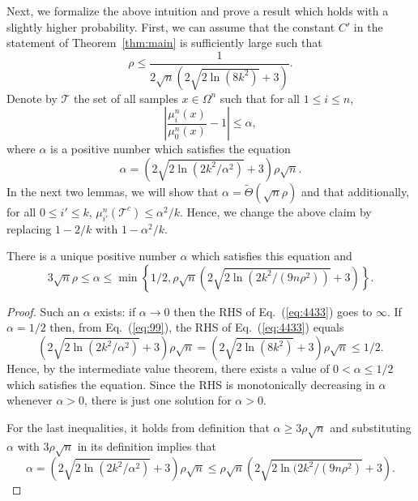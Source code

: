 \documentclass[final, 12pt]{colt2018}
\renewcommand{\eqref}[1]{Eq.~(\ref{#1})}
\begin{document}
Next, we formalize the above intuition and prove a result which holds with a slightly higher probability. First, we can assume that the constant $C'$ in the statement of Theorem~\ref{thm:main} is sufficiently large such that
\begin{equation} \label{eq:99}
\rho \le \frac{1}{2 \sqrt{n} \left( 2 \sqrt{2\ln(8k^2)} + 3 \right)}.
\end{equation}
Denote by $\mathcal{T}$ the set of all samples $x \in \Omega^n$ such that for all $1 \le i \le n$,
\[
\left\lvert \frac{\mu_i^n(x)}{\mu_0^n(x)} -1 \right\vert
\le \alpha,
\]
where $\alpha$ is a positive number which satisfies the equation 
\begin{equation} \label{eq:4433}
\alpha = \left( 2 \sqrt{2\ln(2k^2/\alpha^2)} + 3 \right) \rho \sqrt{n}.
\end{equation}
In the next two lemmas, we will show that $\alpha = \tilde\Theta(\sqrt{n} \rho)$ and that additionally, for all $0 \le i' \le k$, $\mu_{i'}^n(\mathcal{T}^c) \le \alpha^2/k$. Hence, we change the above claim by replacing $1-2/k$ with $1-\alpha^2/k$.

\begin{lemma} \label{lem:alpha}
There is a unique positive number $\alpha$ which satisfies this equation and
\[
3 \sqrt{n} \rho \le \alpha \le \min\left\{ 1/2, \rho \sqrt{n} \left( 2 \sqrt{2\ln(2k^2/(9n \rho^2))} + 3 \right) \right\}.
\]
\end{lemma}

\begin{proof}
Such an $\alpha$ exists: if $\alpha\to 0$ then the RHS of \eqref{eq:4433} goes to $\infty$. If $\alpha =1/2$ then, from \eqref{eq:99}, the RHS of \eqref{eq:4433} equals
\[
\left( 2 \sqrt{2\ln(2k^2/\alpha^2)} + 3 \right) \rho \sqrt{n}
= \left( 2 \sqrt{2\ln(8k^2)} + 3 \right) \rho \sqrt{n}
\le 1/2.
\]
Hence, by the intermediate value theorem, there exists a value of $0<\alpha\le 1/2$ which satisfies the equation. Since the RHS is monotonically decreasing in $\alpha$ whenever $\alpha>0$, there is just one solution for $\alpha>0$. 

For the last inequalities, it holds from definition that $\alpha \ge 3 \rho \sqrt{n}$ and substituting $\alpha$ with $3 \rho \sqrt{n}$  in its definition implies that
\[
\alpha
= \left( 2 \sqrt{2\ln(2k^2/\alpha^2)} + 3 \right) \rho \sqrt{n}
\le \rho \sqrt{n} \left( 2 \sqrt{2\ln(2k^2/(9n \rho^2)} + 3 \right).
\]
\end{proof}
\end{document}
